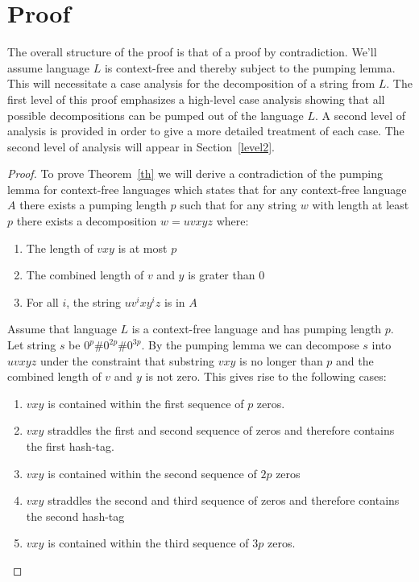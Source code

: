 \documentclass[10pt]{article}
\theoremstyle{definition}
\begin{document}
\section{ Proof }

The overall structure of the proof is that of a proof by contradiction. We'll assume language $L$ is context-free and thereby subject to the pumping lemma. This will necessitate a case analysis for the decomposition of a string from $L$. The first level of this proof emphasizes a high-level case analysis showing that all possible decompositions can be pumped out of the language $L$. A second level of analysis is provided in order to give a more detailed treatment of each case. The second level of analysis will appear in Section~\ref{level2}.

\begin{proof}

To prove Theorem~\ref{th} we will derive a contradiction of the pumping lemma for context-free languages which states that for any context-free language $A$ there exists a pumping length $p$ such that for any string $w$ with length at least $p$ there exists a decomposition $w=uvxyz$ where:
\begin{enumerate}
  \item The length of $vxy$ is at most $p$
  \item The combined length of $v$ and $y$ is grater than $0$
  \item For all $i$, the string $uv^{i}xy^{i}z$ is in $A$
\end{enumerate}

Assume that language $L$ is a context-free language and has pumping length $p$. Let string $s$ be $0^p\#0^{2p}\#0^{3p}$. By the pumping lemma we can decompose $s$ into $uvxyz$ under the constraint that substring $vxy$ is no longer than $p$ and the combined length of $v$ and $y$ is not zero. This gives rise to the following cases:
\begin{enumerate}[ label=\textbf{\roman*.} ]
  \item $vxy$ is contained within the first sequence of $p$ zeros.
  \item $vxy$ straddles the first and second sequence of zeros and therefore contains the first hash-tag.
  \item $vxy$ is contained within the second sequence of $2p$ zeros
  \item $vxy$ straddles the second and third sequence of zeros and therefore contains the second hash-tag
  \item $vxy$ is contained within the third sequence of $3p$ zeros.
\end{enumerate}


\end{proof}
\end{document}
